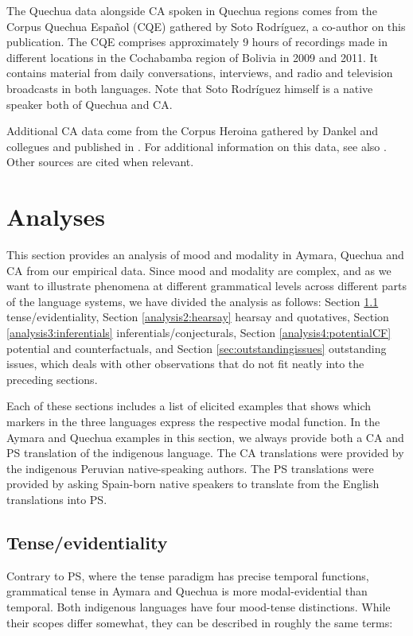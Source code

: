 \documentclass[output=paper,hidelinks]{langscibook}
\begin{document}
The Quechua data alongside CA spoken in Quechua regions comes from the Corpus Quechua Español (CQE) gathered by Soto Rodr\'{i}guez, a co-author on this publication. The CQE comprises approximately 9 hours of recordings made in different locations in the Cochabamba region of Bolivia in 2009 and 2011. It contains material from daily conversations, interviews, and radio and television broadcasts in both languages. Note that Soto Rodr\'{i}guez himself is a native speaker both of Quechua and CA. 

Additional CA data come from the Corpus Heroina gathered by Dankel and collegues and published in \citet{dankelpagel2012}. For additional information on this data, see also \citet{dankel2015strategien}. Other sources are cited when relevant.

\section{Analyses}
\label{sec:analyses}
This section provides an analysis of mood and modality in Aymara, Quechua and CA from our empirical data. Since mood and modality are complex, and as we want to illustrate phenomena at different grammatical levels across different parts of the language systems, we have divided the analysis as follows: Section \ref{analysis1:tense-evid} tense/evidentiality, Section \ref{analysis2:hearsay} hearsay and quotatives, Section \ref{analysis3:inferentials} inferentials/conjecturals, Section \ref{analysis4:potentialCF} potential and counterfactuals, and Section \ref{sec:outstandingissues} outstanding issues, which deals with other observations that do not fit neatly into the preceding sections.

Each of these sections includes a list of elicited examples that shows which markers in the three languages express the respective modal function. In the Aymara and Quechua examples in this section, we always provide both a CA and PS translation of the indigenous language. The CA translations were provided by the indigenous Peruvian native-speaking authors. The PS translations were provided by asking Spain-born native speakers to translate from the English translations into PS. 

\subsection{Tense/evidentiality}
\label{analysis1:tense-evid}
Contrary to PS, where the tense paradigm has precise temporal functions, grammatical tense in Aymara and Quechua is more modal-evidential than temporal. %
Both indigenous languages have four mood-tense distinctions. While their scopes differ somewhat, they can be described in roughly the same terms: 
\end{document}
